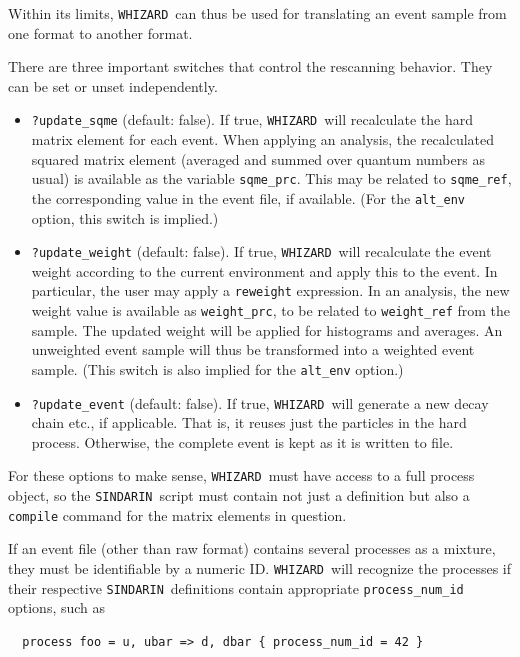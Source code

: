 \documentclass[12pt]{book}
\newcommand{\ttt}[1]{\texttt{#1}}
\newcommand{\whizard}{\ttt{WHIZARD}}
\newcommand{\sindarin}{\ttt{SINDARIN}}
\begin{document}
Within its limits, \whizard\ can thus be used for translating an event
sample from one format to another format.

There are three important switches that control the rescanning
behavior.  They can be set or unset independently.
\begin{itemize}
\item \ttt{?update\_sqme} (default: false).
  If true, \whizard\ will recalculate the hard matrix element for each
  event.  When applying an analysis, the recalculated squared matrix
  element (averaged and summed over quantum numbers as usual) is
  available as the variable \ttt{sqme\_prc}.  This may be related to
  \ttt{sqme\_ref}, the corresponding
  value in the event file, if available.  (For the \ttt{alt\_env}
  option, this switch is implied.)
\item \ttt{?update\_weight} (default: false).
  If true, \whizard\ will recalculate the event weight according to
  the current environment and apply this to the event.  In particular,
  the user may apply a \ttt{reweight} expression.  In an
  analysis, the new weight value is available as \ttt{weight\_prc}, to
  be related
  to \ttt{weight\_ref} from the sample.  The updated weight will be
  applied for histograms and averages.  An unweighted event sample
  will thus be transformed into a weighted event sample.  (This switch
  is also implied for the \ttt{alt\_env} option.)
\item \ttt{?update\_event} (default: false).
  If true, \whizard\ will generate a new decay chain etc., if
  applicable.  That is, it reuses just the particles in the hard
  process.  Otherwise, the complete event is kept as it is written to
  file.
\end{itemize}
For these options to make sense, \whizard\ must have access to a full
process object, so the \sindarin\ script must contain not just a
definition but also a \ttt{compile} command for the matrix elements in
question.

If an event file (other than raw format) contains several processes as
a mixture, they must be identifiable by a numeric ID.  \whizard\ will
recognize the processes if their respective \sindarin\ definitions
contain appropriate \ttt{process\_num\_id} options, such as
\begin{footnotesize}
\begin{verbatim}
  process foo = u, ubar => d, dbar { process_num_id = 42 }
\end{verbatim}
\end{footnotesize}
\end{document}

